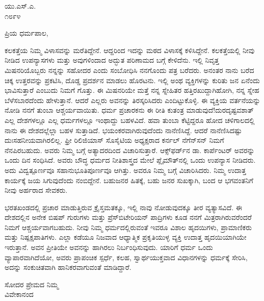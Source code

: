 \vspace{-0.5cm}

\begin{flushright}
ಯು.ಎಸ್.ಎ.\\೧೮೯೪
\end{flushright}

\vspace{-0.5cm}

\noindent
ಪ್ರಿಯ ಧರ್ಮಪಾಲ,

ಕಲಕತ್ತೆಯ ನಿಮ್ಮ ವಿಳಾಸವನ್ನು ಮರೆತಿದ್ದೇನೆ. ಆದ್ದರಿಂದ ಇದನ್ನು ಮಠದ ವಿಳಾಸಕ್ಕೆ ಕಳಿಸಿದ್ದೇನೆ. ಕಲಕತ್ತೆಯಲ್ಲಿ ನೀವು ನೀಡಿದ ಉಪನ್ಯಾಸಗಳು ಮತ್ತು ಅವುಗಳಿಂದಾದ ಅದ್ಭುತ ಪರಿಣಾಮದ ಬಗ್ಗೆ ಕೇಳಿದೆನು. ಇಲ್ಲಿ ನಿವೃತ್ತ ಮಿಷನರಿಯೊಬ್ಬರು ನನ್ನನ್ನು ಸಹೋದರ ಎಂದು ಸಂಬೋಧಿಸಿ ನನಗೊಂದು ಪತ್ರ ಬರೆದರು. ಅನಂತರ ನಾನು ಬರೆದ ಚಿಕ್ಕ ಉತ್ತರವನ್ನು ಪ್ರಕಟಿಸಿ, ದೊಡ್ಡ ಪ್ರದರ್ಶನ ಮಾಡಲು ಹೊರಟನು. ಇಲ್ಲಿ ಅಂಥ ವ್ಯಕ್ತಿಗಳನ್ನು ಕುರಿತು ಜನ ಏನೆಂದು ಭಾವಿಸುತ್ತಾರೆ ಎಂಬುದು ನಿಮಗೆ ಗೊತ್ತು. ಈ ಮಿಷನರಿಯೇ ಮತ್ತೆ ನನ್ನ ಸ್ನೇಹಿತರ ಹತ್ತಿರಖುದ್ದಾಗಿಹೋಗಿ, ನನ್ನ ಸ್ನೇಹ ಬೆಳೆಸಬಾರದೆಂದು ಹೇಳುತ್ತಾನೆ. ಆದರೆ ಎಲ್ಲರು ಅವನನ್ನು ತಿರಸ್ಕರಿಸಿದರು ಎಂದಿಟ್ಟುಕೊಳ್ಳಿ. ಈ ವ್ಯಕ್ತಿಯ ವರ್ತನೆಯನ್ನು ನೋಡಿ ನನಗೆ ತುಂಬಾ ಆಶ್ಚರ್ಯವಾಯಿತು. ಧರ್ಮ ಪ್ರಚಾರಕನು ಈ ರೀತಿ ಕುತಂತ್ರ ಮಾಡುವುದೆ!ದುರದೃಷ್ಟವಶಾತ್ ಎಲ್ಲ ದೇಶಗಳಲ್ಲೂ ಎಲ್ಲ ಧರ್ಮಗಳಲ್ಲೂ ಇಂಥಾದ್ದು ಬಹಳವಿದೆ. ಹವಾ ತುಂಬಾ ಕೆಟ್ಟಿದ್ದರೂ ಹೋದ ಚಳಿಗಾಲದಲ್ಲಿ ನಾನು ಈ ದೇಶದಲ್ಲೆಲ್ಲಾ ಬಹಳ ಸುತ್ತಾಡಿದೆ. ಭಯಂಕರವಾಗಿರುವುದೆಂದು ನಾನೆಣಿಸಿದ್ದೆ. ಆದರೆ ನಾನೆಣಿಸಿದಷ್ಟು ದುಃಸಹನೀಯವಾಗಿರಲಿಲ್ಲ. ಫ್ರೀ ರಿಲಿಜಿಯಾಸ್ ಸೊಸೈಟಿಯ ಅಧ್ಯಕ್ಷರಾದ ಕರ್ನಲ್ ನೆಗೆನ್‌ಸನ್ ನಿಮಗೆ ನೆನಪಿರಬಹುದು. ಅವರು ನಿಮ್ಮ ಬಗ್ಗೆ ಅತ್ಯಾದರದಿಂದ ವಿಚಾರಿಸುತ್ತಾರೆ. ಆಕ್ಸ್‌ಫರ್ಡ್‌ನ ಡಾ. ಕಾರ್ಪೆಂಟರ್ ಅವರನ್ನು ಒಂದು ದಿನ ಸಂಧಿಸಿದೆ. ಅವರು ಬೌದ್ಧ ಧರ್ಮದ ನೀತಿಶಾಸ್ತ್ರದ ಮೇಲೆ ಪ್ಲೈಮೌತ್‌ನಲ್ಲಿ ಒಂದು ಉಪನ್ಯಾಸ ನೀಡಿದರು. ಅದು ವಿದ್ವತ್ಪೂರ್ಣವೂ ಸಹಾನುಭೂತಿಪೂರ್ಣವೂ ಆಗಿತ್ತು. ಅವರೂ ನಿಮ್ಮ ಬಗ್ಗೆ ವಿಚಾರಿಸಿದರು. ನಿಮ್ಮ ಉದಾತ್ತ ಕಾರ್ಯಕ್ಕೆ ಜಯ ಸಿಗುವುದೆಂದು ನಂಬಿದ್ದೇನೆ. ಬಹುಜನರ ಹಿತಕ್ಕೆ, ಬಹು ಜನರ ಸುಖಕ್ಕಾಗಿ, ಬಂದ ಆ ಭಗವಂತನಿಗೆ ನೀವು ಅರ್ಹರಾದ ಸೇವಕರು.

ಭರತಖಂಡದಲ್ಲಿ ಪ್ರಚಾರ ಮಾಡುತ್ತಿರುವ ಕ್ರೈಸ್ತಮತಕ್ಕೂ, ಇಲ್ಲಿ ನಾವು ನೋಡುವುದಕ್ಕೂ ತೀರ ವ್ಯತ್ಯಾಸವಿದೆ. ಈ ದೇಶದಲ್ಲಿನ ಅನೇಕ ಬಿಷಪ್ ಗುರುಗಳು ಮತ್ತು ಪ್ರೆಸ್‌ಬಿಟೇರಿಯನ್ ಪಾದ್ರಿಗಳು ಕೂಡ ನನಗೆ ಮಿತ್ರರಾಗಿರುವರೆಂದರೆ ನಿಮಗೆ ಆಶ್ಚರ್ಯವಾಗಬಹುದು. ನೀವು ನಿಮ್ಮ ಧರ್ಮದಲ್ಲಿರುವಂತೆ ಇವರೂ ವಿಶಾಲ ಹೃದಯಿಗಳು, ಪ್ರಾಮಾಣಿಕರು ಮತ್ತು ನಿಷ್ಪಕ್ಷಪಾತಿಗಳು. ಎಲ್ಲಾ ಕಡೆಯೂ ನಿಜವಾದ ಆಧ್ಯಾತ್ಮಿಕ ಪ್ರಕೃತಿಯುಳ್ಳ ವ್ಯಕ್ತಿ ಉದಾತ್ತ ಹೃದಯಿಯಾಗಿಯೇ ಇರುತ್ತಾನೆ. ಅವನ ಪ್ರೀತಿಯೇ ಅವನನ್ನು ಹಾಗಿರಲು ನಿರ್ಬಂಧಿಸುವುದು. ಯಾರಿಗೆ ಧರ್ಮ ಒಂದು ವ್ಯಾಪಾರವಾಗಿದೆಯೋ, ಅವರು ಪ್ರಾಪಂಚಿಕ ಸ್ಪರ್ಧೆ, ಕಲಹ, ಸ್ವಾರ್ಥಯುಕ್ತವಾದ ವಿಧಾನಗಳನ್ನು ಧರ್ಮಕ್ಕೆ ಸೇರಿಸಿ, ಅದನ್ನು ಸಂಕುಚಿತವಾಗಿ ಹಾನಿಕರವಾಗುವಂತೆ ಮಾಡಿದ್ದಾರೆ.

\vspace{-0.4cm}

{\flushright
ಸೋದರ ಪ್ರೇಮದ ನಿಮ್ಮ\\ವಿವೇಕಾನಂದ\par}


